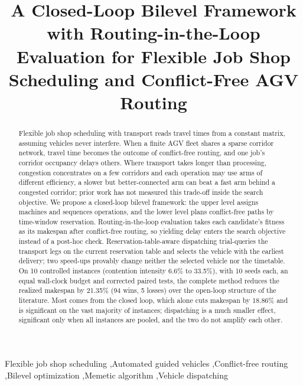 \documentclass[preprint,review,12pt,authoryear,doubleblind]{elsarticle}
\newcommand{\NCases}{10}
\newcommand{\NSeeds}{10}
\newcommand{\GainLoopRule}{18.86\%}      %
\newcommand{\GainEndToEnd}{21.35\%}      %
\newcommand{\WinEndToEnd}{94}
\newcommand{\LoseEndToEnd}{5}
\newcommand{\ContentionLo}{6.6\%}
\newcommand{\ContentionHi}{33.5\%}
\begin{document}
\begin{frontmatter}

\title{A Closed-Loop Bilevel Framework with Routing-in-the-Loop Evaluation for Flexible Job Shop Scheduling and Conflict-Free AGV Routing}


\begin{abstract}
Flexible job shop scheduling with transport reads travel times from a constant matrix, assuming vehicles never interfere.
When a finite AGV fleet shares a sparse corridor network, travel time becomes the outcome of conflict-free routing, and one job's corridor occupancy delays others.
Where transport takes longer than processing, congestion concentrates on a few corridors and each operation may use arms of different efficiency, a slower but better-connected arm can beat a fast arm behind a congested corridor; prior work has not measured this trade-off inside the search objective.
We propose a closed-loop bilevel framework: the upper level assigns machines and sequences operations, and the lower level plans conflict-free paths by time-window reservation.
Routing-in-the-loop evaluation takes each candidate's fitness as its makespan after conflict-free routing, so yielding delay enters the search objective instead of a post-hoc check.
Reservation-table-aware dispatching trial-queries the transport legs on the current reservation table and selects the vehicle with the earliest delivery; two speed-ups provably change neither the selected vehicle nor the timetable.
On \NCases{} controlled instances (contention intensity \ContentionLo{} to \ContentionHi{}), with \NSeeds{} seeds each, an equal wall-clock budget and corrected paired tests, the complete method reduces the realized makespan by \GainEndToEnd{} (\WinEndToEnd{} wins, \LoseEndToEnd{} losses) over the open-loop structure of the literature.
Most comes from the closed loop, which alone cuts makespan by \GainLoopRule{} and is significant on the vast majority of instances; dispatching is a much smaller effect, significant only when all instances are pooled, and the two do not amplify each other.
\end{abstract}


\begin{keyword}
Flexible job shop scheduling \sep Automated guided vehicles \sep Conflict-free routing \sep Bilevel optimization \sep Memetic algorithm \sep Vehicle dispatching
\end{keyword}

\end{frontmatter}
\end{document}
